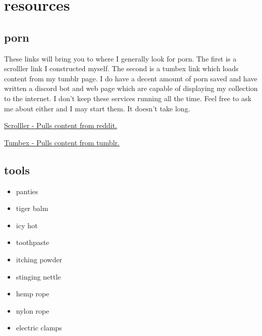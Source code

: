 \documentclass{article}
\begin{document}
\newpage

\section{resources}

\subsection{porn}

These links will bring you to where I generally look for porn.
The first is a scrolller link I constructed myself.
The second is a tumbex link which loads content from my tumblr page.
I do have a decent amount of porn saved and have written a discord bot and web page which are capable of displaying my collection to the internet.
I don't keep these services running all the time.
Feel free to ask me about either and I may start them.
It doesn't take long.

\href{https://scrolller.com/r/goddesses+Sexyness+overknees+Womenorgasm+CosplayBeauties+cosplaybutts+cuckoldcaptions+femdomcaptions+sissycaptions+HandsInPanties+PussyWedgie+quiver+forcedorgasms+cameltoe+RuinedOrgasms+postorgasm+orgasmcontrol+panties+leotards+FayeReagan+WedgieGirls+sybian+shinybondage+HoldingIt+OnePieceSuits+NSFWTiedTogether+teaseonly+leotard+WYCSTVTTU+ExtremeCameltoe+hipcleavage+fithips+boyshorts+girlsinyogashorts+lingerie+Playboy+gettingherselfoff+YogaPants+TightShorts+girlsinyogapants+femdom_gifs+TooCuteForPorn+DarkAngels+Ebony+OrgasmTorture}{Scrolller - Pulls content from reddit.}

\href{https://www.tumbex.com/gyzmoify.tumblr/posts}{Tumbex - Pulls content from tumblr.}

\subsection{tools}

\begin{itemize}
    \item panties
    \item tiger balm
    \item icy hot
    \item toothpaste
    \item itching powder
    \item stinging nettle
    \item hemp rope
    \item nylon rope
    \item electric clamps
\end{itemize}
\end{document}
